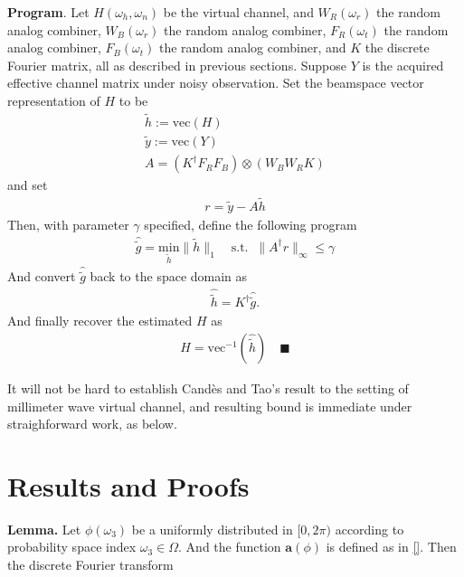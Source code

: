 \documentclass[12pt]{article}
\newcounter{numResult}
\newcommand{\myCount}
{
   \stepcounter{numResult}
   \textbf{\arabic{numResult}}
}
\begin{document}
\myCount
\textbf{Program}.
Let \(H(\omega_h, \omega_n)\) be the virtual channel, and \(W_R(\omega_r)\) the random analog combiner, \(W_B(\omega_r)\) the random analog combiner, \(F_R(\omega_t)\) the random analog combiner, \(F_B(\omega_t)\) the random analog combiner, and \(K\) the discrete Fourier matrix, all as described in previous sections.
Suppose \(Y\) is the acquired effective channel matrix under noisy observation.
Set the beamspace vector representation of \(H\) to be
\begin{gather}
\tilde{h} := \mathrm{vec}(H) \\
\tilde{y} := \mathrm{vec}(Y) \\
A =(K^\dagger F_R F_B) \otimes (W_B W_R K)
\end{gather}
and set
\begin{gather}
r =\tilde{y} -A \tilde{h}
\end{gather}
Then, with parameter \(\gamma\) specified, define the following program
\begin{gather}
\hat{\tilde{g}}
=\underset {{\tilde{h}}} {\mathrm{min}} \|\tilde{h}\|_1 \quad
\mathrm{s.t.}\;\; \|A^\dagger r\|_\infty \leq \gamma
\end{gather}
And convert \(\hat{\tilde{g}}\) back to the space domain as
\begin{gather}
\hat{\tilde{h}}
=K^\dagger \hat{\tilde{g}}.
\end{gather}
And finally recover the estimated \(H\) as
\begin{gather}
\hat{H} =\mathrm{vec}^{-1} (\hat{\tilde{h}}) \quad \blacksquare
\end{gather}

It will not be hard to establish Cand\`es and Tao's result to the setting of millimeter wave virtual channel, and resulting bound is immediate under straighforward work, as below.

\section{Results and Proofs}

\textbf{Lemma.} Let \(\phi(\omega_3)\) be a uniformly distributed in \([0,2\pi)\) according to probability space index \(\omega_3 \in \Omega\).
And the function \(\mathbf{a}(\phi)\) is defined as in \eqref{}.
Then the discrete Fourier transform 
\end{document}
